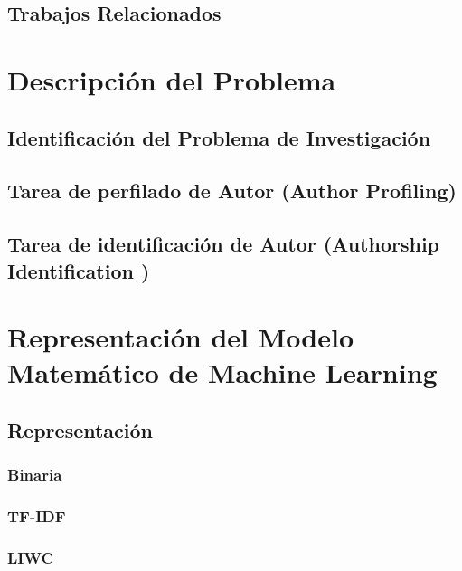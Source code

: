 \documentclass[12pt, runningheads,a4]{book}
\begin{document}
\section{Trabajos Relacionados}

\chapter{Descripción del Problema} \label{cap.3}

\section{Identificación del Problema de Investigación}


\section{Tarea de perfilado de Autor (Author Profiling)}

\section{Tarea de identificación de Autor (Authorship Identification )}

\chapter{Representación del Modelo Matemático de Machine Learning} \label{cap.4}

\section{Representación}

	\subsection{Binaria}

	\subsection{TF-IDF}

	\subsection{LIWC}
\end{document}
